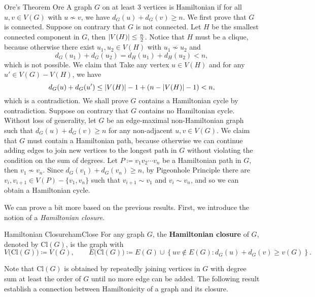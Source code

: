 \documentclass[math, code]{amznotes}
\theoremstyle{remark}
\begin{document}
\begin{thmbox}{Ore's Theorem} {Ore}
    A graph $G$ on at least $3$ vertices is Hamiltonian if for all $u, v \in V(G)$ with $u \not\sim v$, we have $d_G(u) + d_G(v) \geq n$.
    \tcblower
    We first prove that $G$ is connected. Suppose on contrary that $G$ is not connected. Let $H$ be the smallest connected component in $G$, then ${\left\lvert {V(H)} \right\rvert} \leq \frac{n}{2}$. Notice that $H$ must be a clique, because otherwise there exist $u_1, u_2 \in V(H)$ with $u_1 \not\sim u_2$ and
    \begin{equation*}
        d_G(u_1) + d_G(u_2) = d_H(u_1) + d_H(u_2) < n,
    \end{equation*}
    which is not possible. We claim that Take any vertex $u \in V(H)$ and for any $u' \in V(G) - V(H)$, we have 
    \begin{equation*}
        d_G(u) + d_G(u') \leq {\left\lvert {V(H)} \right\rvert} - 1 + \left(n - {\left\lvert {V(H)} \right\rvert} - 1\right) < n,
    \end{equation*}
    which is a contradiction. We shall prove $G$ contains a Hamiltonian cycle by contradiction. Suppose on contrary that $G$ contains no Hamiltonian cycle. Without loss of generality, let $G$ be an edge-maximal non-Hamiltonian graph such that $d_G(u) + d_G(v) \geq n$ for any non-adjacent $u, v \in V(G)$. We claim that $G$ must contain a Hamiltonian path, because otherwise we can continue adding edges to join new vertices to the longest path in $G$ without violating the condition on the sum of degrees. Let $P \coloneqq v_1v_2\cdots v_n$ be a Hamiltonian path in $G$, then $v_1 \not\sim v_n$. Since $d_G(v_1) + d_G(v_n) \geq n$, by Pigeonhole Principle there are $v_i, v_{i + 1} \in V(P) - \{v_1, v_n\}$ such that $v_{i + 1} \sim v_1$ and $v_i \sim v_n$, and so we can obtain a Hamiltonian cycle.
\end{thmbox}
We can prove a bit more based on the previous results. First, we introduce the notion of a \textit{Hamiltonian closure}.
\begin{dfnbox}{Hamiltonian Closure}{hamClose}
    For any graph $G$, the {\color{red} \textbf{Hamiltonian closure}} of $G$, denoted by $\mathrm{Cl}(G)$, is the graph with
    \begin{equation*}
        V\bigl(\mathrm{Cl}(G)\bigr) \coloneqq V(G), \qquad E\bigl(\mathrm{Cl}(G)\bigr) \coloneqq E(G) \cup \left\{uv \notin E(G) \colon d_G(u) + d_G(v) \geq v(G)\right\}.
    \end{equation*}
\end{dfnbox}
Note that $\mathrm{Cl}(G)$ is obtained by repeatedly joining vertices in $G$ with degree sum at least the order of $G$ until no more edge can be added. The following result establish a connection between Hamiltonicity of a graph and its closure.
\end{document}
